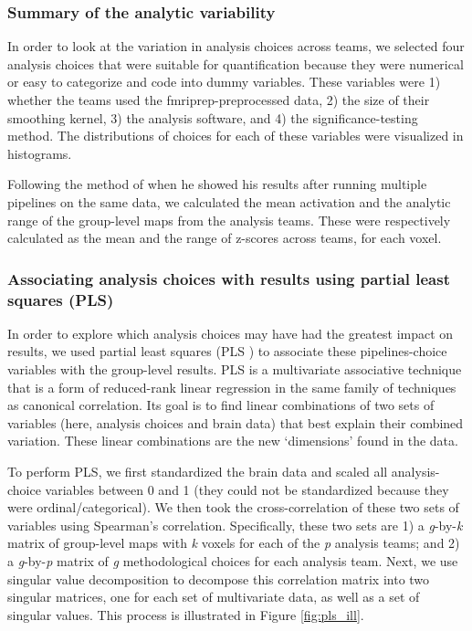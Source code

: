 \documentclass[a4paper,doc,natbib]{apa6}
\begin{document}
\subsubsection{Summary of the analytic variability}
In order to look at the variation in analysis choices across teams, we selected four analysis choices that were suitable for quantification because they were numerical or easy to categorize and code into dummy variables. These variables were 1) whether the teams used the fmriprep-preprocessed data, 2) the size of their smoothing kernel, 3) the analysis software, and 4) the significance-testing method. The distributions of choices for each of these variables were visualized in histograms.

Following the method of \cite{carp_plurality_2012} when he showed his results after running multiple pipelines on the same data, we calculated the mean activation and the analytic range of the group-level maps from the analysis teams. These were respectively calculated as the mean and the range of z-scores across teams, for each voxel. 

\subsubsection{Associating analysis choices with results using partial least squares (PLS)}
In order to explore which analysis choices may have had the greatest impact on results, we used partial least squares (PLS \citealp{mcintosh2013multivariate, mcintosh2004partial}) to associate these pipelines-choice variables with the group-level results. PLS is a multivariate associative technique that is a form of reduced-rank linear regression in the same family of techniques as canonical correlation. Its goal is to find linear combinations of two sets of variables (here, analysis choices and brain data) that best explain their combined variation. These linear combinations are the new `dimensions' found in the data. 

To perform PLS, we first standardized the brain data and scaled all analysis-choice variables between 0 and 1 (they could not be standardized because they were ordinal/categorical). We then took the cross-correlation of these two sets of variables using Spearman's correlation. Specifically, these two sets are 1) a \textit{g}-by-\textit{k} matrix of group-level maps with \textit{k} voxels for each of the \textit{p} analysis teams; and 2) a \textit{g}-by-\textit{p} matrix of \textit{g} methodological choices for each analysis team.  Next, we use singular value decomposition to decompose this correlation matrix into two singular matrices, one for each set of multivariate data, as well as a set of singular values. This process is illustrated in Figure \ref{fig:pls_ill}. 
\end{document}
